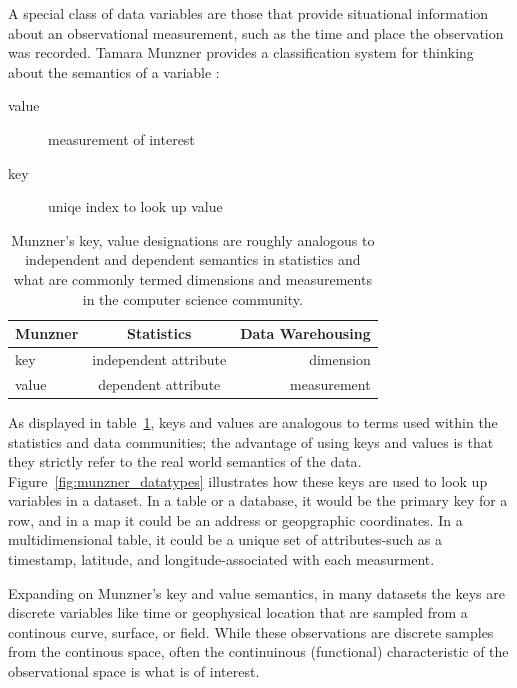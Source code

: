 \documentclass[letterpaper,onecolumn,titlepage]{Ythesis}
\begin{document}
A special class of data variables are those that provide situational information about an observational measurement, such as the time and place the observation was recorded. Tamara Munzner provides a classification system for thinking about the semantics of a variable \cite{munzner_what_2014}:
\begin{description}
\item[value] measurement of interest 
\item[key] uniqe index to look up value
\end{description}

\begin{table}
\begin{center}
\begin{tabular}{ l c r }
  Munzner & Statistics & Data Warehousing \\
  \hline
  key & independent attribute & dimension \\
  value & dependent attribute & measurement\\
\end{tabular}
\caption{Munzner's key, value designations are roughly analogous to independent and dependent semantics in statistics and what are commonly termed dimensions and measurements in the computer science community.}
\label{table:munzner_semantics}
\end{center}
\end{table}

As displayed in table~\ref{table:munzner_semantics}, keys and values are analogous to terms used within the statistics and data communities; the advantage of using keys and values is that they strictly refer to the real world semantics of the data\cite{munzner_what_2014}. Figure~\ref{fig:munzner_datatypes} illustrates how these keys are used to look up variables in a dataset. In a table or a database, it would be the primary key for a row, and in a map it could be an address or geopgraphic coordinates. In a multidimensional table, it could be a unique set of attributes-such as a timestamp, latitude, and longitude-associated with each measurment. 

Expanding on Munzner's key and value semantics, in many datasets the keys are discrete variables like time or geophysical location that are sampled from a continous curve, surface, or field. While these observations are discrete samples from the continous space, often the continuinous (functional) characteristic\cite{ramsay_functional_2006,muller_functional_2006} of the observational space is what is of interest.
\end{document}

